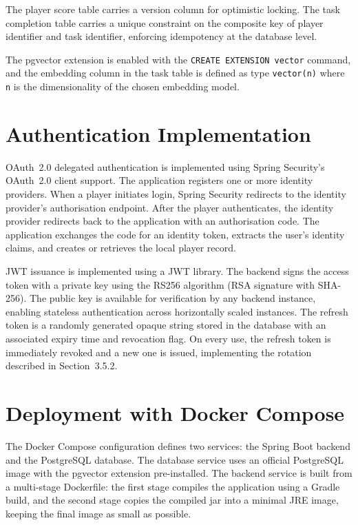 The player score table carries a version column for optimistic locking. The task completion table carries a unique constraint on the composite key of player identifier and task identifier, enforcing idempotency at the database level.

The pgvector extension is enabled with the \texttt{CREATE EXTENSION vector} command, and the embedding column in the task table is defined as type \texttt{vector(n)} where \texttt{n} is the dimensionality of the chosen embedding model.


\section{Authentication Implementation}

OAuth~2.0 delegated authentication is implemented using Spring Security's OAuth~2.0 client support. The application registers one or more identity providers. When a player initiates login, Spring Security redirects to the identity provider's authorisation endpoint. After the player authenticates, the identity provider redirects back to the application with an authorisation code. The application exchanges the code for an identity token, extracts the user's identity claims, and creates or retrieves the local player record.

JWT issuance is implemented using a JWT library. The backend signs the access token with a private key using the RS256 algorithm (RSA signature with SHA-256). The public key is available for verification by any backend instance, enabling stateless authentication across horizontally scaled instances. The refresh token is a randomly generated opaque string stored in the database with an associated expiry time and revocation flag. On every use, the refresh token is immediately revoked and a new one is issued, implementing the rotation described in Section~3.5.2.


\section{Deployment with Docker Compose}

The Docker Compose configuration defines two services: the Spring Boot backend and the PostgreSQL database. The database service uses an official PostgreSQL image with the pgvector extension pre-installed. The backend service is built from a multi-stage Dockerfile: the first stage compiles the application using a Gradle build, and the second stage copies the compiled jar into a minimal JRE image, keeping the final image as small as possible.

